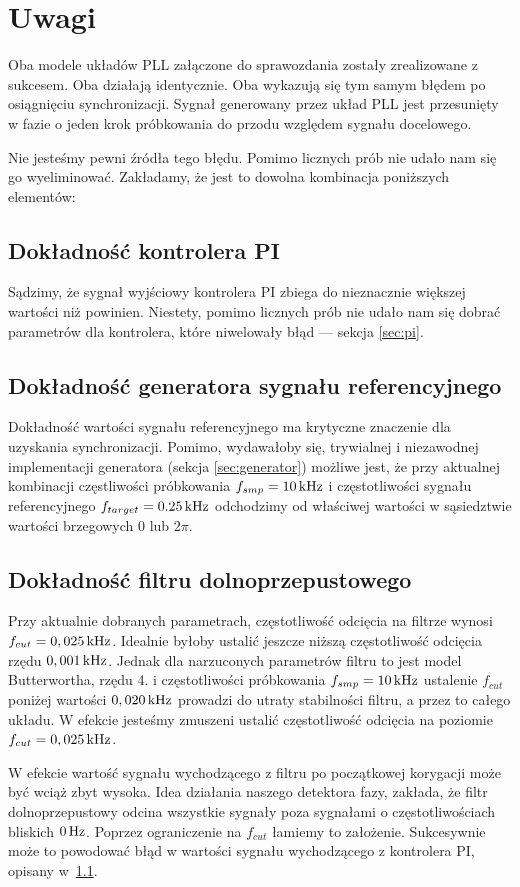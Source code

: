\section{Uwagi}
Oba modele układów PLL załączone do sprawozdania zostały zrealizowane z
sukcesem. Oba działają identycznie. Oba wykazują się tym samym błędem po
osiągnięciu synchronizacji. Sygnał generowany przez układ PLL jest przesunięty w
fazie o jeden krok próbkowania do przodu względem sygnału docelowego.

Nie jesteśmy pewni źródła tego błędu. Pomimo licznych prób nie udało nam się go
wyeliminować. Zakładamy, że jest to dowolna kombinacja poniższych elementów:

\subsection{Dokładność kontrolera PI}
\label{sec:uwagi_pi}
Sądzimy, że sygnał wyjściowy kontrolera PI zbiega do nieznacznie większej
wartości niż powinien. Niestety, pomimo licznych prób nie udało nam się dobrać
parametrów dla kontrolera, które niwelowały błąd --- sekcja \ref{sec:pi}.

\subsection{Dokładność generatora sygnału referencyjnego}
Dokładność wartości sygnału referencyjnego ma krytyczne znaczenie dla uzyskania
synchronizacji. Pomimo, wydawałoby się, trywialnej i niezawodnej implementacji
generatora (sekcja \ref{sec:generator}) możliwe jest, że przy aktualnej
kombinacji częstliwości próbkowania $f_{smp} = \unit[10]{kHz}$ i częstotliwości
sygnału referencyjnego $f_{target} = \unit[0.25]{kHz}$ odchodzimy od właściwej
wartości w sąsiedztwie wartości brzegowych $0$ lub $2\pi$.

\subsection{Dokładność filtru dolnoprzepustowego}
Przy aktualnie dobranych parametrach, częstotliwość odcięcia na filtrze wynosi
$f_{cut} = \unit[0,025]{kHz}$. Idealnie byłoby ustalić jeszcze niższą
częstotliwość odcięcia rzędu $\unit[0,001]{kHz}$. Jednak dla narzuconych
parametrów filtru to jest model Butterwortha, rzędu 4. i częstotliwości
próbkowania $f_{smp} = \unit[10]{kHz}$ ustalenie $f_{cut}$ poniżej wartości
$\unit[0,020]{kHz}$ prowadzi do utraty stabilności filtru, a przez to całego
układu. W efekcie jesteśmy zmuszeni ustalić częstotliwość odcięcia na poziomie
$f_{cut} = \unit[0,025]{kHz}$.

W efekcie wartość sygnału wychodzącego z filtru po początkowej
korygacji może być wciąż zbyt wysoka. Idea działania naszego detektora fazy,
zakłada, że filtr dolnoprzepustowy odcina wszystkie sygnały poza sygnałami o
częstotliwościach bliskich $\unit[0]{Hz}$. Poprzez ograniczenie na $f_{cut}$
łamiemy to założenie. Sukcesywnie może to powodować błąd w wartości sygnału
wychodzącego z kontrolera PI, opisany w~\ref{sec:uwagi_pi}.
